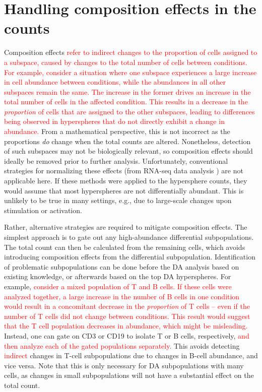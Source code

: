 \documentclass{article}
\newcommand\revised[1]{\textcolor{red}{#1}}
\begin{document}
\section{Handling composition effects in the counts}
Composition effects \revised{refer to indirect changes to the proportion of cells assigned to a subspace, caused by changes to the total number of cells between conditions.
For example, consider a situation where one subspace experiences a large increase in cell abundance between conditions, while the abundances in all other subspaces remain the same.
The increase in the former drives an increase in the total number of cells in the affected condition.
This results in a decrease in the \textit{proportion} of cells that are assigned to the other subspaces, leading to differences being observed in hyperspheres that do not directly exhibit a change in abundance.}
From a mathematical perspective, this is not incorrect as the proportions \textit{do} change when the total counts are altered.
Nonetheless, detection of such subspaces may not be biologically relevant, so composition effects should ideally be removed prior to further analysis.
Unfortunately, conventional strategies for normalizing these effects (from RNA-seq data analysis \cite{robinson2010scaling}) are not applicable here.
If these methods were applied to the hypersphere counts, they would assume that most hyperspheres are not differentially abundant.
This is unlikely to be true in many settings, e.g., due to large-scale changes upon stimulation or activation.

Rather, alternative strategies are required to mitigate composition effects.
The simplest approach is to gate out any high-abundance differential subpopulations.
The total count can then be calculated from the remaining cells, which avoids introducing composition effects from the differential subpopulation.
Identification of problematic subpopulations can be done before the DA analysis based on existing knowledge, or afterwards based on the top DA hyperspheres.
For example, \revised{consider a mixed population of T and B cells.
    If these cells were analyzed together, a large increase in the number of B cells in one condition would result in a concomitant decrease in the \textit{proportion} of T cells -- even if the number of T cells did not change between conditions.
    This result would suggest that the T cell population decreases in abundance, which might be misleading.} 
Instead, one can gate on CD3 or CD19 to isolate T or B cells, respectively, \revised{and then analyze each of the gated populations separately.}
This avoids detecting \revised{indirect} changes in T-cell subpopulations due to changes in B-cell abundance, and vice versa.
Note that this is only necessary for DA subpopulations with many cells, as changes in small subpopulations will not have a substantial effect on the total count.
\end{document}
